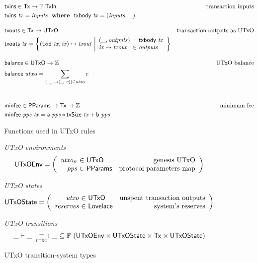 \begin{figure}
  \begin{align*}
    & \fun{txins} \in \Tx \to \powerset{\TxIn}
    & \text{transaction inputs} \\
    & \txins{tx} = \var{inputs} \where \txbody{tx} = (\var{inputs}, ~\wcard)
    \nextdef
    & \fun{txouts} \in \Tx \to \UTxO
    & \text{transaction outputs as UTxO} \\
    & \fun{txouts} ~ \var{tx} =
      \left\{ (\fun{txid} ~ \var{tx}, \var{ix}) \mapsto \var{txout} ~
      \middle| \begin{array}{l@{~}c@{~}l}
                 (\_, \var{outputs}) & = & \txbody{tx} \\
                 \var{ix} \mapsto \var{txout} & \in & \var{outputs}
               \end{array}
      \right\}
    \nextdef
    & \fun{balance} \in \UTxO \to \mathbb{Z}
    & \text{UTxO balance} \\
    & \fun{balance} ~ utxo = \sum_{(~\wcard ~ \mapsto (\wcard, ~c)) \in \var{utxo}} c\\
   \nextdef
    & \fun{minfee} \in \PPMMap \to \Tx \to \mathbb{Z} & \text{minimum fee}\\
    & \fun{minfee}~\var{pps}~\var{tx} =
      \fun{a}~\var{pps} * \fun{txSize}~\var{tx} + \fun{b}~\var{pps}
  \end{align*}
  \caption{Functions used in UTxO rules}
  \label{fig:derived-defs:utxo}
\end{figure}

\begin{figure}
  \emph{UTxO environments}
  \begin{equation*}
    \UTxOEnv =
    \left(
      \begin{array}{r@{~\in~}lr}
        \var{utxo_0} & \UTxO & \text{genesis UTxO}\\
        \var{pps} & \PPMMap & \text{protocol parameters map}
      \end{array}
    \right)
  \end{equation*}

  \emph{UTxO states}
  \begin{equation*}
    \UTxOState =
    \left(
      \begin{array}{r@{~\in~}lr}
        \var{utxo} & \UTxO & \text{unspent transaction outputs}\\
        \var{reserves} & \Lovelace & \text{system's reserves}
      \end{array}
    \right)
  \end{equation*}

  \emph{UTxO transitions}
  \begin{equation*}
    \_ \vdash
    \var{\_} \trans{utxo}{\_} \var{\_}
    \subseteq \powerset (\UTxOEnv \times \UTxOState \times \Tx \times \UTxOState)
  \end{equation*}
  \caption{UTxO transition-system types}
  \label{fig:ts-types:utxo}
\end{figure}

